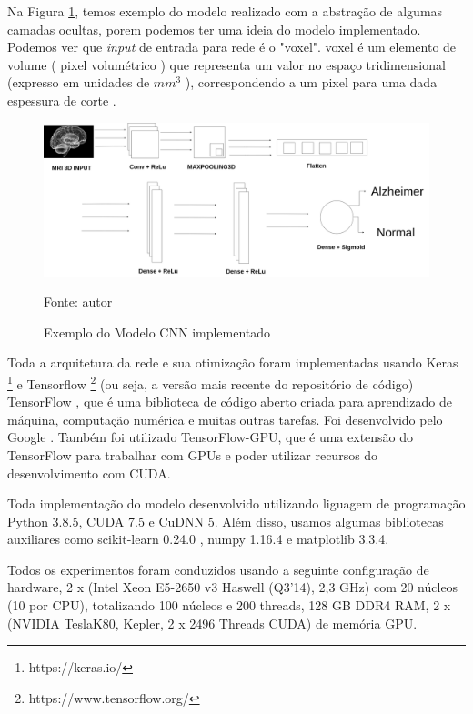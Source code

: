 \documentclass[openright]{UFRGS} %
\begin{document}
Na Figura  \ref{fig:cnnmodel}, temos  exemplo do modelo realizado com a abstração de algumas camadas ocultas, porem podemos ter uma ideia do modelo implementado. 
Podemos ver  que \textit{input} de entrada para rede é o "voxel". voxel é um elemento de volume ( pixel volumétrico ) que representa um valor no espaço tridimensional (expresso em unidades de  ${mm^3}$ ), correspondendo a um pixel para uma dada espessura de corte \cite{watkins2001structural}.

\begin{figure}[h]
    \centering
    \caption{Exemplo do Modelo CNN implementado}
    \includegraphics[scale=0.20]{cnn3d.png}
    \centerline{Fonte: autor}
    \label{fig:cnnmodel}
\end{figure}



Toda a arquitetura da rede e sua otimização foram implementadas usando Keras \footnote[1]{https://keras.io/}  e  Tensorflow \footnote[2]{https://www.tensorflow.org/}  (ou seja, a versão mais recente do repositório de código) TensorFlow  , que é uma biblioteca de código aberto criada para aprendizado de máquina, computação numérica e muitas outras tarefas. Foi desenvolvido pelo Google \cite{abadi2016tensorflow}. Também  foi utilizado  TensorFlow-GPU, que é uma extensão do TensorFlow para trabalhar com GPUs e poder utilizar  recursos do desenvolvimento com CUDA. 

Toda implementação do modelo desenvolvido utilizando liguagem de programação Python 3.8.5, CUDA 7.5 e CuDNN 5. Além disso, usamos algumas bibliotecas auxiliares como scikit-learn 0.24.0 , numpy 1.16.4 e matplotlib 3.3.4. 



Todos os experimentos foram conduzidos usando a seguinte configuração de hardware, 2 x (Intel Xeon E5-2650 v3 Haswell (Q3'14), 2,3 GHz) com 20 núcleos (10 por CPU), totalizando 100 núcleos e 200 threads, 128 GB DDR4 RAM, 2 x (NVIDIA TeslaK80, Kepler, 2 x 2496 Threads CUDA) de memória GPU.
\end{document}
